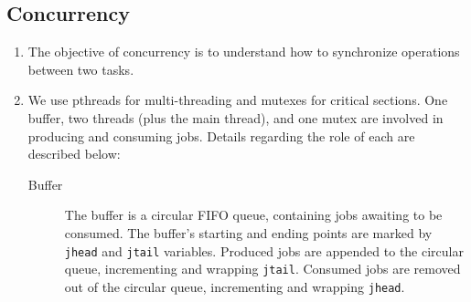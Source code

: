 \documentclass[letterpaper,10pt]{article}
\begin{document}
\subsection{Concurrency}
\begin{enumerate}
\item The objective of concurrency is to understand how to synchronize operations between two tasks.
\item We use pthreads for multi-threading and mutexes for critical sections. One buffer, two threads (plus the main thread), and one mutex are involved in producing and consuming jobs. Details regarding the role of each are described below:
\begin{description}
\item[Buffer] The buffer is a circular FIFO queue, containing jobs awaiting to be consumed. The buffer's starting and ending points are marked by \texttt{jhead} and \texttt{jtail} variables. Produced jobs are appended to the circular queue, incrementing and wrapping \texttt{jtail}. Consumed jobs are removed out of the circular queue, incrementing and wrapping \texttt{jhead}.


\end{description}
\end{enumerate}
\end{document}
